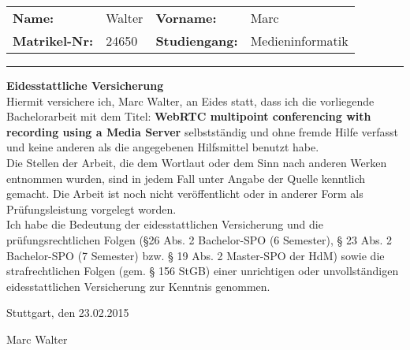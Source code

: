 
\begingroup
\let\clearpage\relax %
\thispagestyle{empty} %
\parindent0pt %

\begin{tabularx}{\textwidth}{ XX XX }
\textbf{Name:} & Walter & \textbf{Vorname:} &Marc\\
\textbf{Matrikel-Nr:} & 24650 & \textbf{Studiengang:} & Medieninformatik\\
\end{tabularx}
\vspace{6mm}
\hrule



\vspace{20mm}

\textbf{\Large{Eidesstattliche Versicherung}}\\

Hiermit versichere ich, Marc Walter, an Eides statt, dass ich die vorliegende Bachelorarbeit mit dem Titel: \textbf{WebRTC multipoint conferencing with recording using a Media Server} selbstständig und ohne fremde Hilfe verfasst und keine anderen als die angegebenen Hilfsmittel benutzt habe. \\
Die Stellen der Arbeit, die dem Wortlaut oder dem Sinn nach anderen Werken entnommen wurden, sind in jedem Fall unter Angabe der Quelle kenntlich gemacht. Die Arbeit ist noch nicht veröffentlicht oder in anderer Form als Prüfungsleistung vorgelegt worden.\\

Ich habe die Bedeutung der eidesstattlichen Versicherung und die prüfungsrechtlichen Folgen (§26 Abs. 2 Bachelor-SPO (6 Semester), § 23 Abs. 2 Bachelor-SPO (7 Semester) bzw. § 19 Abs. 2 Master-SPO der HdM) sowie die strafrechtlichen Folgen (gem. § 156 StGB) einer unrichtigen oder unvollständigen eidesstattlichen Versicherung zur Kenntnis genommen.


\vspace{15mm}
Stuttgart, den 23.02.2015


\vspace{3cm}
Marc Walter


\endgroup